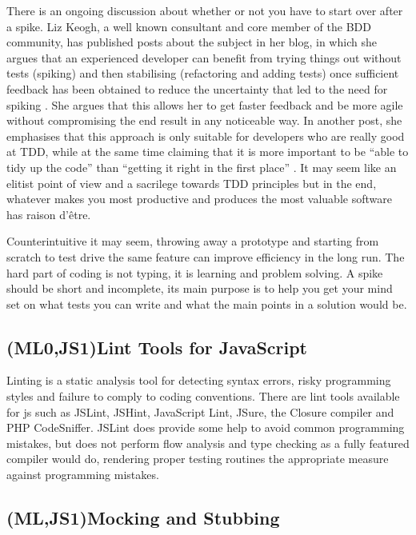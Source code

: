 \documentclass[11pt]{article}
\begin{document}
There is an ongoing discussion about whether or not you have to start over after a spike. Liz Keogh, a well known consultant and core member of the BDD community, has published posts about the subject in her blog, in which she argues that an experienced developer can benefit from trying things out without tests (spiking) and then stabilising (refactoring and adding tests) once sufficient feedback has been obtained to reduce the uncertainty that led to the need for spiking \cite{Liz1}. She argues that this allows her to get faster feedback and be more agile without compromising the end result in any noticeable way. In another post, she emphasises that this approach is only suitable for developers who are really good at TDD, while at the same time claiming that it is more important to be ``able to tidy up the code'' than ``getting it right in the first place'' \cite{Liz2}. It may seem like an elitist point of view and a sacrilege towards TDD principles but in the end, whatever makes you most productive and produces the most valuable software has raison d'être.

Counterintuitive it may seem, throwing away a prototype and starting from scratch to test drive the same feature can improve efficiency in the long run. The hard part of coding is not typing, it is learning and problem solving. A spike should be short and incomplete, its main purpose is to help you get your mind set on what tests you can write and what the main points in a solution would be. \cite[question~60]{Edelstam}

\subsection{(ML0,JS1)Lint Tools for JavaScript}
\label{subsec:Lint}

Linting is a static analysis tool for detecting syntax errors, risky programming styles and failure to comply to coding conventions. There are lint tools available for \gls{js} such as JSLint, JSHint, JavaScript Lint, JSure, the Closure compiler and PHP CodeSniffer. JSLint does provide some help to avoid common programming mistakes, but does not perform flow analysis \cite{JSLint} and type checking as a fully featured compiler would do, rendering proper testing routines the appropriate measure against programming mistakes.

\subsection{(ML,JS1)Mocking and Stubbing}
\label{subsec:mocking}
\end{document}
